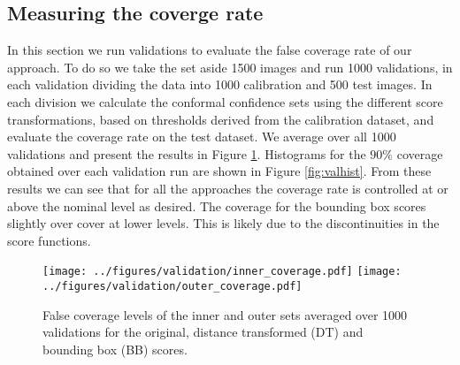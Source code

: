 \subsection{Measuring the coverge rate}\label{SS:cov}
In this section we run validations to evaluate the false coverage rate of our approach. To do so we take the set aside 1500 images and run 1000 validations, in each validation dividing the data into 1000 calibration and 500 test images. In each division we calculate the conformal confidence sets using the different score transformations, based on thresholds derived from the calibration dataset, and evaluate the coverage rate on the test dataset. We average over all 1000 validations and present the results in Figure \ref{fig:coverage}. Histograms for the $90\%$ coverage obtained over each validation run are shown in Figure \ref{fig:valhist}. From these results we can see that for all the approaches the coverage rate is controlled at or above the nominal level as desired. The coverage for the bounding box scores slightly over cover at lower levels. This is likely due to the discontinuities in the score functions. 
\begin{figure}
	\begin{center}
		\texttt{[image: ../figures/validation/inner\_coverage.pdf]}
		\quad\quad
		\texttt{[image: ../figures/validation/outer\_coverage.pdf]}
	\end{center}
	\caption{False coverage levels of the inner and outer sets averaged over 1000 validations for the original, distance transformed (DT) and bounding box (BB) scores.}\label{fig:coverage}
\end{figure}


